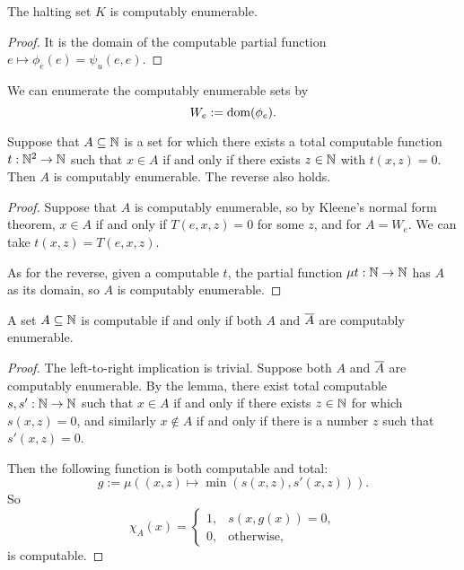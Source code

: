\begin{proposition}
  The halting set $K$ is computably enumerable.
\end{proposition}

\begin{proof}
  It is the domain of the computable partial function $e \mapsto \phi_e(e) =
  \psi_u(e,e)$.
\end{proof}

We can enumerate the computably enumerable sets by
\[
  W_e := \operatorname{dom}(\phi_e).
\]

\begin{lemma}
  Suppose that $A \subseteq \mathbb{N}$ is a set for which there exists a total
  computable function $t: \mathbb{N}^2 \to \mathbb{N}$ such that $x \in A$ if and only if there
  exists $z \in \mathbb{N}$ with $t(x,z) = 0$.
  Then $A$ is computably enumerable.
  The reverse also holds.
\end{lemma}

\begin{proof}
  Suppose that $A$ is computably enumerable, so by Kleene's normal form theorem,
  $x \in A$ if and only if $T(e,x,z) = 0$ for some $z$, and for $A = W_e$.
  We can take $t(x,z) = T(e,x,z)$.

  As for the reverse, given a computable $t$, the partial function
  $\mu t: \mathbb{N} \to \mathbb{N}$  has $A$ as its domain, so $A$ is computably enumerable.
\end{proof}

\begin{theorem}
  A set $A \subseteq \mathbb{N}$ is computable if and only if both $A$ and $\overline{A}$ are
  computably enumerable.
\end{theorem}

\begin{proof}
  The left-to-right implication is trivial.
  Suppose both $A$ and $\overline{A}$ are computably enumerable.
  By the lemma, there exist total computable $s,s': \mathbb{N} \to \mathbb{N}$ such that $x \in
  A$ if and only if there exists $z \in \mathbb{N}$ for which $s(x,z) = 0$, and
  similarly $x \notin A$ if and only if there is a number $z$ such that $s'(x,z)
  = 0$.

  Then the following function is both computable and total:
  \[
	g := \mu ((x,z) \mapsto \min(s(x,z), s'(x,z))).
  \]
  So
  \[
	\chi_A(x) =
	\begin{cases}
	  1, & s(x,g(x)) = 0, \\
	  0, & \text{otherwise},
	\end{cases}
  \]
  is computable.
\end{proof}

